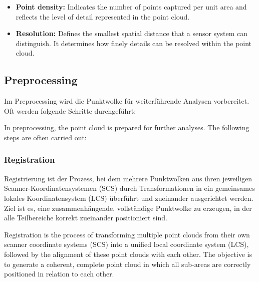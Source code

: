 \begin{English}
\begin{itemize}
        \item \textbf{Point density:} Indicates the number of points captured per unit area and reflects the level of detail represented in the point cloud. \cite{wieserKursGeodaetischeMesstechnik}
        
        \item \textbf{Resolution:} Defines the smallest spatial distance that a sensor system can distinguish. It determines how finely details can be resolved within the point cloud. \cite{wieserKursGeodaetischeMesstechnik}
    \end{itemize}

\end{English}
\setlength{\parindent}{\oldparindent}


\subsection{Preprocessing}
\begin{German}
    Im Preprocessing wird die Punktwolke für weiterführende Analysen vorbereitet. Oft werden folgende Schritte durchgeführt:
\end{German}

\begin{English}
    In preprocessing, the point cloud is prepared for further analyses. The following steps are often carried out:
\end{English}

\subsubsection{Registration}
\begin{German}
    Registrierung ist der Prozess, bei dem mehrere Punktwolken aus ihren jeweiligen Scanner-Koordinatensystemen (SCS) durch Transformationen in ein gemeinsames lokales Koordinatensystem (LCS) überführt und zueinander ausgerichtet werden. Ziel ist es, eine zusammenhängende, vollständige Punktwolke zu erzeugen, in der alle Teilbereiche korrekt zueinander positioniert sind. \cite{voordendagKursGeodaetischeMesstechnik}
\end{German}

\begin{English}
    Registration is the process of transforming multiple point clouds from their own scanner coordinate systems (SCS) into a unified local coordinate system (LCS), followed by the alignment of these point clouds with each other. The objective is to generate a coherent, complete point cloud in which all sub-areas are correctly positioned in relation to each other. \cite{voordendagKursGeodaetischeMesstechnik}
\end{English}


